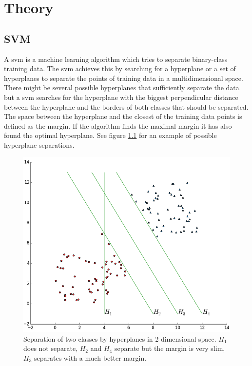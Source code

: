 
\chapter{Theory}
\label{ch:theory}

\section{SVM}
A \acrfull{svm} is a machine learning algorithm which tries to separate binary-class training data. The \gls{svm} achieves this by searching for a hyperplane or a set of hyperplanes to separate the points of training data in a multidimensional space. There might be several possible hyperplanes that sufficiently separate the data but a \gls{svm} searches for the hyperplane with the biggest perpendicular distance between the hyperplane and the borders of both classes that should be separated. The space between the hyperplane and the closest of the training data points is defined as the margin. If the algorithm finds the maximal margin it has also found the optimal hyperplane. See figure \ref{fig:svmHyperplaneSeparation} for an example of possible hyperplane separations.

\begin{figure}[ht]
	\centering
	\includegraphics[scale=0.5]{figures/theorySVM_hyperplanes}
	\caption{Separation of two classes by hyperplanes in 2 dimensional space. $H_1$ does not separate, $H_2$ and $H_4$ separate but the margin is very slim, $H_3$ separates with a much better margin.}
	\label{fig:svmHyperplaneSeparation}
\end{figure}


